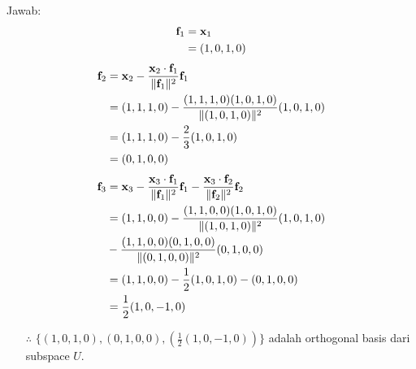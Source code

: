 \documentclass[12pt, a4paper]{scrartcl}
\begin{document}
\begin{enumerate}
\begin{enumerate}
                Jawab:
                \setcounter{equation}{0}
                \begin{align}
                    \notag \textbf{f}_1 &= \textbf{x}_1
                    \\ &= (1,0,1,0)
                \end{align}
                \begin{align}
                    \notag \textbf{f}_2 &= \textbf{x}_2 - \frac{\textbf{x}_2 \cdot \textbf{f}_1}{\Vert \textbf{f}_1 \Vert^2} \textbf{f}_1
                    \\\notag &= (1,1,1,0) - \frac{(1,1,1,0) (1,0,1,0)}{\Vert(1,0,1,0)\Vert^2} (1,0,1,0)
                    \\\notag &= (1,1,1,0) - \frac{2}{3} (1,0,1,0)
                    \\ &= (0,1,0,0)
                \end{align}
                \begin{align}
                    \notag \textbf{f}_3 &= \textbf{x}_3 - \frac{\textbf{x}_3 \cdot \textbf{f}_1}{\Vert\textbf{f}_1\Vert^2}\textbf{f}_1  - \frac{\textbf{x}_3 \cdot \textbf{f}_2}{\Vert\textbf{f}_2\Vert^2}\textbf{f}_2
                    \\\notag &= (1,1,0,0) - \frac{(1,1,0,0)(1,0,1,0)}{\Vert(1,0,1,0)\Vert^2}(1,0,1,0) 
                    \\\notag &- \frac{(1,1,0,0)(0,1,0,0)}{\Vert (0,1,0,0) \Vert^2}(0,1,0,0)
                    \\\notag &= (1,1,0,0) - \frac{1}{2}(1,0,1,0) - (0,1,0,0)
                    \\ &= \frac{1}{2}(1,0,-1,0)
                \end{align}
                \begin{itemize}
                    \item[$\therefore$] $\{(1,0,1,0),(0,1,0,0),(\frac{1}{2}(1,0,-1,0))\}$ adalah orthogonal basis dari subspace $U$.
                \end{itemize}


\end{enumerate}
\end{enumerate}
\end{document}
